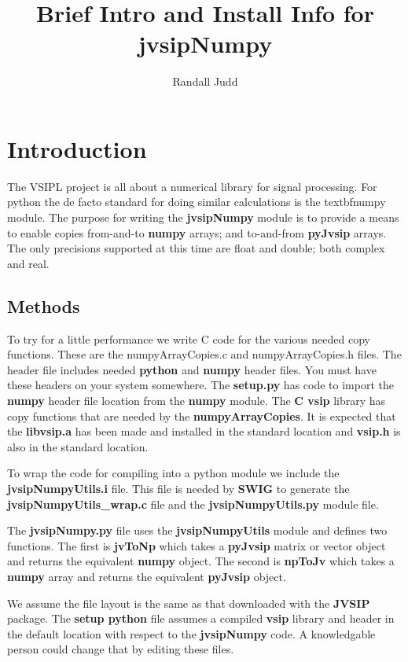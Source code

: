 \documentclass[11pt]{article}
\title{Brief Intro and Install Info for jvsipNumpy}
\author{Randall Judd}
\newcommand{\ttbf}[1]{{\ttfamily \bfseries #1}}
\begin{document}
    
    \maketitle
    
    \section*{Introduction}
 The VSIPL project is all about a numerical library for signal processing. For python
the de facto standard for doing similar calculations is the textbf{numpy} module. The purpose
for writing the \textbf{jvsipNumpy} module is to provide a means to enable copies from-and-to
\textbf{numpy} arrays; and to-and-from \textbf{pyJvsip} arrays. The only precisions supported at this
time are float and double; both complex and real.
\subsection*{Methods}
To try for a little performance we write C code for the various needed copy functions.
These are the numpyArrayCopies.c and numpyArrayCopies.h files. The header file
includes needed \textbf{python} and \textbf{numpy} header files. You must have these headers on your
system somewhere.  The \textbf{setup.py} has code to import the \textbf{numpy} header file location from the \textbf{numpy} module.  The \textbf{C vsip} library has copy functions that are needed by the  \textbf{numpyArrayCopies}.  It is expected that the \textbf{libvsip.a} has been made and installed
in the standard location and \textbf{vsip.h} is also in the standard location.

To wrap the code for compiling into a python module we include the \textbf{jvsipNumpyUtils.i}
file. This file is needed by \textbf{SWIG} to generate the \textbf{jvsipNumpyUtils\_wrap.c} file and the
\textbf{jvsipNumpyUtils.py} module file.

The \textbf{jvsipNumpy.py} file uses the \textbf{jvsipNumpyUtils} module and defines two functions.
The first is  \ttbf{jvToNp} which takes a \textbf{pyJvsip} matrix or vector object and returns the
equivalent \textbf{numpy} object. The second is \ttbf{npToJv} which takes a \textbf{numpy} array and returns
the equivalent \textbf{pyJvsip} object.

We assume the file layout is the same as that downloaded with the \textbf{JVSIP} package. The \textbf{setup python} file assumes a compiled \textbf{vsip} library and header in the default location with respect to the \textbf{jvsipNumpy} code.  A knowledgable person could change that by editing these files.
\end{document}
